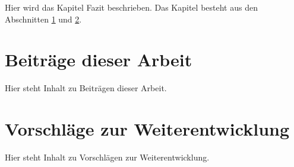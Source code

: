 Hier wird das Kapitel Fazit beschrieben. Das Kapitel besteht aus den Abschnitten \ref{sec:beitraege} und \ref{sec:weiterentwicklung}.


\section{Beiträge dieser Arbeit}
\label{sec:beitraege}

Hier steht Inhalt zu Beiträgen dieser Arbeit.


\section{Vorschläge zur Weiterentwicklung}
\label{sec:weiterentwicklung}

Hier steht Inhalt zu Vorschlägen zur Weiterentwicklung.
